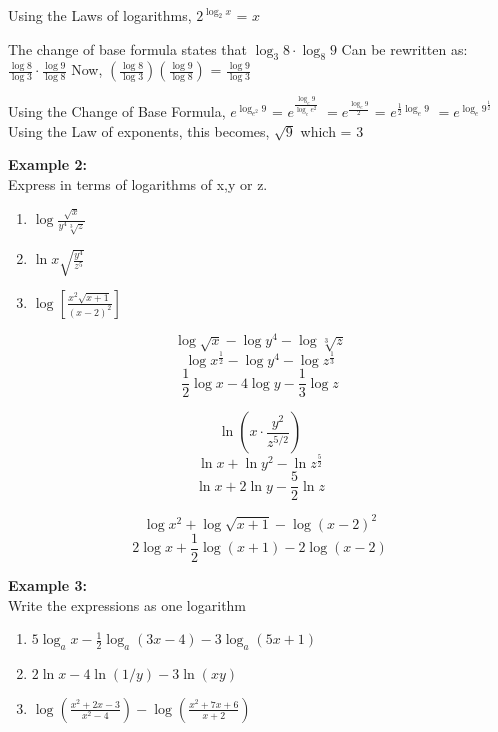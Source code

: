 \documentclass{report}
\begin{document}

 Using the Laws of logarithms,
 \bigbreak
 $2^{\log_{2}x}$ = $x$
\bigbreak \noindent \bigbreak \noindent
{}

 The change of base formula states that $\log_{3}8 \cdot \log_{8}9$ 
\bigbreak
Can be rewritten as: $\frac{\log8}{\log3} \cdot \frac{\log9}{\log8}$
\bigbreak
Now,
\bigbreak
$\left(\frac{\log 8}{\log 3}\right)\left(\frac{\log 9}{\log 8}\right)$ 
\bigbreak
= $\frac{\log9}{\log3}$ 
\bigbreak \noindent \bigbreak \noindent
{}

Using the Change of Base Formula,
\bigbreak
$e^{\log_{e^2}9}$ = $e^{\frac{\log _e 9}{\log _e e^2}}$
\bigbreak
$=e^{\frac{\log _e 9}{2}}$
\bigbreak
= $e^{\frac{1}{2} \log _e 9}$
\bigbreak
$=e^{\log _e 9^{\frac{1}{2}}}$
\bigbreak
Using the Law of exponents, this becomes,
\bigbreak
$\sqrt{9}$ which = $3$
\bigbreak \noindent \bigbreak \noindent
\begin{mdframed}
\begin{large}
	\textbf{Example 2:} \\
	Express in terms of logarithms of x,y or z.
\end{large}
\begin{enumerate}
	\item  $\log \frac{\sqrt{x}}{y^4 \sqrt[3]{z}}$
	\item  $\ln x \sqrt{\frac{y^4}{z^5}}$
	\item  $\log \left[\frac{x^2 \sqrt{x+1}}{(x-2)^2}\right]$
\end{enumerate}
\end{mdframed}
\bigbreak \noindent
{}

$$
\log \sqrt{x}-\log y^4-\log \sqrt[3]{z}
$$
$$
\log x^{\frac{1}{2}}-\log y^4-\log z^{\frac{1}{3}}
$$
$$
\boxed{\frac{1}{2} \log x-4 \log y-\frac{1}{3} \log z}
$$
\bigbreak \noindent
{}

$$
\ln \left(x \cdot \frac{y^2}{z^{5 / 2}}\right)
$$
$$
\ln x+\ln y^2-\ln z^{\frac{5}{2}}
$$
$$
\boxed{\ln x+2 \ln y-\frac{5}{2} \ln z}
$$
\bigbreak \noindent


$$
\log x^{2}+\log \sqrt{x+1}-\log (x-2)^{{2}}
$$
$$
\boxed{2\log x+\frac{1}{2} \log (x+1)-2 \log (x-2)}
$$
\bigbreak \noindent \bigbreak \noindent
\begin{mdframed}
 \begin{large}
	 \textbf{Example 3:} \\
	 Write the expressions as one logarithm
 \end{large} 
 \begin{enumerate}
	 \item  $5 \log _a x-\frac{1}{2} \log _a(3 x-4)-3 \log _a(5 x+1)$
	\item $2 \ln x-4 \ln (1 / y)-3 \ln (x y)$
	\item $\log \left(\frac{x^2+2 x-3}{x^2-4}\right)-\log \left(\frac{x^2+7 x+6}{x+2}\right)$
 \end{enumerate}
\end{mdframed}
\bigbreak \noindent \bigbreak \noindent
{}
\end{document}
